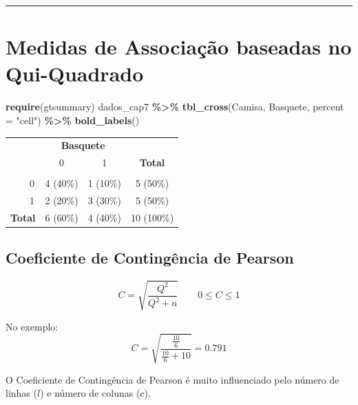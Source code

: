 \documentclass[
]{book}
\newenvironment{Shaded}{\begin{snugshade}}{\end{snugshade}}
\newcommand{\AttributeTok}[1]{\textcolor[rgb]{0.13,0.29,0.53}{#1}}
\newcommand{\FunctionTok}[1]{\textcolor[rgb]{0.13,0.29,0.53}{\textbf{#1}}}
\newcommand{\NormalTok}[1]{#1}
\newcommand{\SpecialCharTok}[1]{\textcolor[rgb]{0.81,0.36,0.00}{\textbf{#1}}}
\newcommand{\StringTok}[1]{\textcolor[rgb]{0.31,0.60,0.02}{#1}}
\begin{document}
\begin{center}\rule{0.5\linewidth}{0.5pt}\end{center}

\section{Medidas de Associação baseadas no Qui-Quadrado}\label{medidas-de-associauxe7uxe3o-baseadas-no-qui-quadrado}

\begin{Shaded}
\begin{Highlighting}[]
\FunctionTok{require}\NormalTok{(gtsummary)}
\NormalTok{dados\_cap7 }\SpecialCharTok{\%\textgreater{}\%} \FunctionTok{tbl\_cross}\NormalTok{(Camisa, Basquete, }\AttributeTok{percent =} \StringTok{"cell"}\NormalTok{) }\SpecialCharTok{\%\textgreater{}\%}
  \FunctionTok{bold\_labels}\NormalTok{()}
\end{Highlighting}
\end{Shaded}

\begin{table}[t]
\fontsize{12.0pt}{14.4pt}\selectfont
\begin{tabular*}{\linewidth}{@{\extracolsep{\fill}}lccc}
\toprule
 & \multicolumn{2}{c}{\textbf{Basquete}} &  \\ 
\cmidrule(lr){2-3}
 & 0 & 1 & \textbf{Total} \\ 
\midrule\addlinespace[2.5pt]
{\bfseries Camisa} &  &  &  \\ 
    0 & 4 (40\%) & 1 (10\%) & 5 (50\%) \\ 
    1 & 2 (20\%) & 3 (30\%) & 5 (50\%) \\ 
{\bfseries Total} & 6 (60\%) & 4 (40\%) & 10 (100\%) \\ 
\bottomrule
\end{tabular*}
\end{table}

\subsection{Coeficiente de Contingência de Pearson}\label{coeficiente-de-continguxeancia-de-pearson}

\[C = \sqrt{\frac{Q^2}{Q^2 + n}} \qquad 0\leq C\leq1\]

No exemplo:\\
\[C = \sqrt{\frac{\frac{10}{6}}{\frac{10}{6} + 10}} = 0.791\]

O Coeficiente de Contingência de Pearson é muito influenciado pelo número de linhas (\(l\)) e número de colunas (\(c\)).
\end{document}
